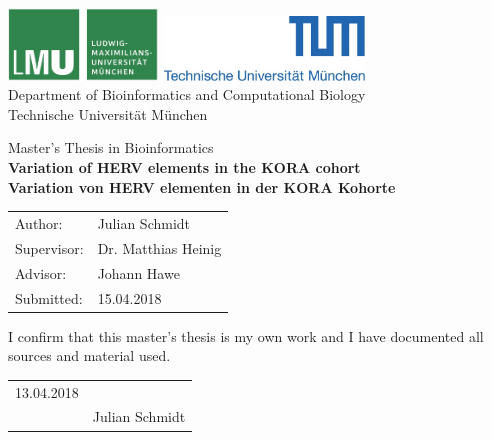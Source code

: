 \documentclass[a4paper,12pt,twoside,openright]{report}
\begin{document}
\begin{titlepage}
{\sffamily


\begin{center}
\includegraphics[width=0.3\textwidth]{../figures/LMU-logo.jpg}
\hfill
\includegraphics[width=0.4\textwidth]{../figures/TUM-logo.jpg}  
\\[1.5cm]  

{\LARGE Department of Bioinformatics and Computational Biology}\\[0.5cm]
{Technische Universit\"at M\"unchen}\\[1cm]
\begin{spacing}{1.6}
{\Large Master's Thesis in Bioinformatics}\\[1.6cm]
{\textbf{\LARGE Variation of HERV elements in the KORA cohort}}\\[1.6cm]
{\textbf{\LARGE Variation von HERV elementen in der KORA Kohorte}}\\[3.6cm]
\end{spacing}

\end{center}
\begin{center}\Large
  \begin{tabular}{ll}
    Author:& Julian Schmidt\\
    Supervisor: & Dr. Matthias Heinig\\
    Advisor:        & Johann Hawe\\
    Submitted:     &  15.04.2018\\
  \end{tabular}
\end{center}

}%
\end{titlepage}


\vspace*{6cm}
\begin{center}
\begin{minipage}{.6\textwidth}
I confirm that this master's thesis is my own work and I have documented all sources and material used.
\\[2cm]
\begin{tabular}{p{} p{}}
13.04.2018 & \hrulefill \\
& \hspace{1.95cm} Julian Schmidt
\end{tabular}
\end{minipage}
\end{center}
\end{document}
